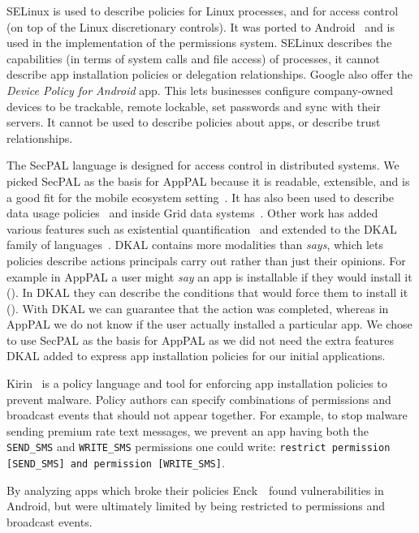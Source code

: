 \documentclass[]{llncs}
\newcommand{\citep}[1]{\cite{#1}}
\begin{document}
SELinux is used to describe policies for Linux processes, and for access control (on top of the Linux discretionary controls).
It was ported to Android~\cite{Smalley:2013vl} and is used in the implementation of the permissions system.
SELinux describes the capabilities (in terms of system calls and file access) of processes, it cannot describe app installation policies or delegation relationships.
Google also offer the \emph{Device Policy for Android} app.
This lets businesses configure company-owned devices to be trackable, remote lockable, set passwords and sync with their servers.
It cannot be used to describe policies about apps, or describe trust relationships.

The SecPAL language is designed for access control in distributed systems.
We picked SecPAL as the basis for AppPAL because it is readable, extensible, and is a good fit for the mobile ecosystem setting~\citep{Hallett:2014un}.
It has also been used to describe data usage policies~\cite{Aziz:2011vt} and inside Grid data systems~\cite{Humphrey:2007wc}.
Other work has added various features such as existential
quantification~\cite{Becker:2009vt} and extended to the DKAL family of languages~\cite{Gurevich:2008fz,Gurevich:Qo5E3M3}.
DKAL contains more modalities than \emph{says}, which lets policies describe actions principals carry out rather than just their opinions.
For example in AppPAL a user might \emph{say} an app is installable if they would install it ().
In DKAL they can describe the conditions that would force them to install it ().
With DKAL we can guarantee that the action was completed, whereas in AppPAL we do not know if the user actually installed a particular app.
We chose to use SecPAL as the basis for AppPAL as we did not need the extra features DKAL added to express app installation policies for our initial applications.

Kirin~\cite{Enck:2009ko} is a policy language and tool for enforcing app installation policies to prevent malware.
Policy authors can specify combinations of permissions and broadcast events that should not appear together.
For example, to stop malware sending premium rate text messages, we prevent an
app having both the \texttt{SEND\_SMS} and \texttt{WRITE\_SMS} permissions one
could write: \texttt{restrict permission [SEND\_SMS] and permission [WRITE\_SMS]}.

By analyzing apps which broke their policies Enck~\etal~found vulnerabilities in Android, but were ultimately limited by being restricted to permissions and broadcast events.
\end{document}
